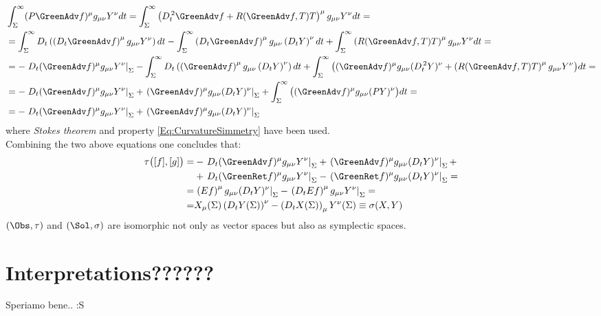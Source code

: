 \documentclass[Main]{subfiles}
\begin{document}
		\begin{align}
			&\int_\Sigma^\infty (P \GreenAdv f)^\mu g_{\mu \nu} Y^\nu dt = \int_\Sigma^\infty \left( D_t^{\,2} \GreenAdv f +R(\GreenAdv f,T)T \right)^\mu g_{\mu \nu} Y^\nu dt = \nonumber \\
			&= 
			 \int_\Sigma^\infty D_t \left( \left(D_t  \GreenAdv f \right)^\mu g_{\mu \nu} Y^\nu \right)dt -
			 \int_\Sigma^\infty \left( D_t  \GreenAdv f \right)^\mu g_{\mu \nu} \left( D_t Y \right)^\nu dt +
			 \int_\Sigma^\infty \left( R( \GreenAdv f,T)T \right)^\mu g_{\mu \nu} Y^\nu dt = \nonumber \\
			&= 
			 - \left. D_t( \GreenAdv f)^\mu g_{\mu \nu} Y^\nu \right\vert_\Sigma -
			 \int_\Sigma^\infty D_t \left( \left( \GreenAdv f \right)^\mu g_{\mu \nu} \left( D_t Y \right)^\nu \right)dt + \int_\Sigma^\infty \big(
			 (\GreenAdv f)^\mu g_{\mu \nu} (D_t^{\, 2}Y)^\nu + 
			 \left(R( \GreenAdv f,T)T \right)^\mu g_{\mu \nu} Y^\nu
			 \big) dt	=	 \nonumber \\
			 &=
			 -   \left. D_t( \GreenAdv f)^\mu g_{\mu \nu} Y^\nu \right\vert_\Sigma
			 +  \left. ( \GreenAdv f)^\mu g_{\mu \nu} (D_t Y)^\nu \right\vert_\Sigma
			 + \int_\Sigma^\infty \big(
			 (\GreenAdv f)^\mu g_{\mu \nu} (P Y)^\nu 
			 \big) dt =\nonumber \\
			 &= 
			 -   \left. D_t( \GreenAdv f)^\mu g_{\mu \nu} Y^\nu \right\vert_\Sigma
			 +  \left. ( \GreenAdv f)^\mu g_{\mu \nu} (D_t Y)^\nu \right\vert_\Sigma
		\end{align}
		where \emph{Stokes theorem} and property \ref{Eq:CurvatureSimmetry} have been used.
		\\
		Combining the two above equations one concludes that:
		\begin{align}
		\tau\big( [f], [g] \big) =& 
			 -   \left. D_t( \GreenAdv f)^\mu g_{\mu \nu} Y^\nu \right\vert_\Sigma
			 +  \left. ( \GreenAdv f)^\mu g_{\mu \nu} (D_t Y)^\nu \right\vert_\Sigma		+
		\nonumber \\
			&+ \left. D_t( \GreenRet f)^\mu g_{\mu \nu} Y^\nu \right\vert_\Sigma
			   -  \left. ( \GreenRet f)^\mu g_{\mu \nu} (D_t Y)^\nu \right\vert_\Sigma		
		 =  \nonumber\\
		=&\left. \left( E f \right)^\mu g_{\mu \nu} ( D_t Y)^\nu\right\vert_\Sigma	 
		-  \left.\left(D_t E f \right)^\mu g_{\mu \nu}  Y^\nu \right\vert_\Sigma	= \nonumber \\
		=& X_\mu(\Sigma) \left( D_t Y (\Sigma)\right)^\nu - \left(D_t X(\Sigma)\right)_\mu Y^\nu(\Sigma) \equiv \sigma( X, Y)
		\end{align}
		$(\Obs, \tau)$ and $(\Sol, \sigma)$ are isomorphic not only as vector spaces but also as symplectic spaces.

\section{Interpretations??????}
	\begin{Warning}
		Speriamo bene.. :S
	\end{Warning}
\end{document}
